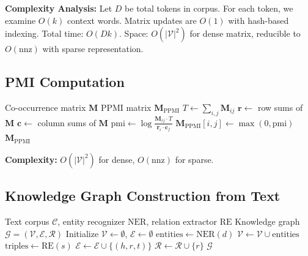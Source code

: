 \documentclass[conference]{IEEEtran}
\begin{document}
\textbf{Complexity Analysis:} Let $D$ be total tokens in corpus. For each token, we examine $O(k)$ context words. Matrix updates are $O(1)$ with hash-based indexing. Total time: $O(Dk)$. Space: $O(|\mathcal{V}|^2)$ for dense matrix, reducible to $O(\text{nnz})$ with sparse representation.

\subsection{PMI Computation}

\begin{algorithm}
\caption{PPMI Computation}
\begin{algorithmic}[1]
\REQUIRE Co-occurrence matrix $\mathbf{M}$
\ENSURE PPMI matrix $\mathbf{M}_{\text{PPMI}}$
\STATE $T \leftarrow \sum_{i,j} \mathbf{M}_{ij}$ 
\STATE $\mathbf{r} \leftarrow$ row sums of $\mathbf{M}$
\STATE $\mathbf{c} \leftarrow$ column sums of $\mathbf{M}$
    \STATE $\text{pmi} \leftarrow \log\frac{\mathbf{M}_{ij} \cdot T}{\mathbf{r}_i \cdot \mathbf{c}_j}$
    \STATE $\mathbf{M}_{\text{PPMI}}[i,j] \leftarrow \max(0, \text{pmi})$
\ENDFOR
\RETURN $\mathbf{M}_{\text{PPMI}}$
\end{algorithmic}
\end{algorithm}

\textbf{Complexity:} $O(|\mathcal{V}|^2)$ for dense, $O(\text{nnz})$ for sparse.

\subsection{Knowledge Graph Construction from Text}

\begin{algorithm}
\caption{Knowledge Graph Extraction}
\begin{algorithmic}[1]
\REQUIRE Text corpus $\mathcal{C}$, entity recognizer $\text{NER}$, relation extractor $\text{RE}$
\ENSURE Knowledge graph $\mathcal{G} = (\mathcal{V}, \mathcal{E}, \mathcal{R})$
\STATE Initialize $\mathcal{V} \leftarrow \emptyset$, $\mathcal{E} \leftarrow \emptyset$
    \STATE $\text{entities} \leftarrow \text{NER}(d)$
    \STATE $\mathcal{V} \leftarrow \mathcal{V} \cup \text{entities}$
        \STATE $\text{triples} \leftarrow \text{RE}(s)$
                \STATE $\mathcal{E} \leftarrow \mathcal{E} \cup \{(h, r, t)\}$
                \STATE $\mathcal{R} \leftarrow \mathcal{R} \cup \{r\}$
            \ENDIF
        \ENDFOR
    \ENDFOR
\ENDFOR
\RETURN $\mathcal{G}$
\end{algorithmic}
\end{algorithm}
\end{document}
